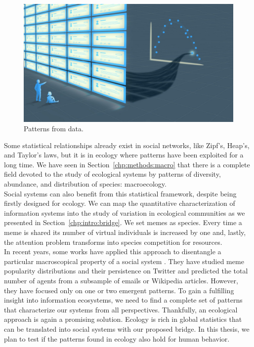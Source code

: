 \begin{figure}[t]
     \centering
\includegraphics[width=\columnwidth]{figures/methods/fig_TEAMS.png}
 \caption[Patterns from data]{Patterns from data.}
\label{chp:methods:fig:mTEAMS}
\end{figure}

Some statistical relationships already exist in social networks, like Zipf's, Heap's, and Taylor's laws, but it is in ecology where patterns have been exploited for a long time. We have seen in Section~\ref{chp:methods:macro} that there is a complete field devoted to the study of ecological systems by patterns of diversity, abundance, and distribution of species: macroecology.\\

Social systems can also benefit from this statistical framework, despite being firstly designed for ecology. We can map the quantitative characterization of information systems into the study of variation in ecological communities as we presented in Section~\ref{chp:intro:bridge}. We set memes as species. Every time a meme is shared its number of virtual individuals is increased by one and, lastly, the attention problem transforms into species competition for resources.\\

In recent years, some works have applied this approach to disentangle a particular macroscopical property of a social system \cite{plata2021neutral,tovo2021upscaling}. They have studied meme popularity distributions and their persistence on Twitter and predicted the total number of agents from a subsample of emails or Wikipedia articles. However, they have focused only on one or two emergent patterns. To gain a fulfilling insight into information ecosystems, we need to find a complete set of patterns that characterize our systems from all perspectives. Thankfully, an ecological approach is again a promising solution. Ecology is rich in global statistics that can be translated into social systems with our proposed bridge. In this thesis, we plan to test if the patterns found in ecology also hold for human behavior.

